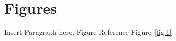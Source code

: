 \documentclass[english]{article}
\begin{document}

\nocite{*}
\maketitle

\setcounter{page}{1}

\clearpage
\pagebreak
\section{Figures}

\par Insert Paragraph here. Figure Reference Figure~\ref{fig:1}
\end{document}
